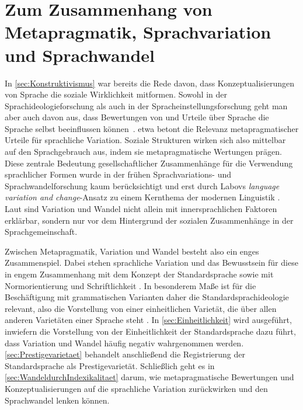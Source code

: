 \section[Zusammenhang von Metapragmatik, Sprachvariation und Sprachwandel]{Zum Zusammenhang von Metapragmatik, Sprachvariation und Sprachwandel}
\label{sec:MetapragmatikVariationWandel}
\begin{sloppypar}
In \autoref{sec:Konstruktivismus} war bereits die Rede davon, dass Konzeptualisierungen von Sprache die soziale Wirklichkeit mitformen. 
Sowohl in der Sprachideologieforschung als auch in der Spracheinstellungsforschung geht man aber auch davon aus, dass Bewertungen von und Urteile über Sprache die Sprache selbst beeinflussen k{\"o}nnen~\citep[s.][xxiv]{Preston.1999b}. 
\citet[45]{Preston2004} etwa betont die Relevanz metapragmatischer Urteile für sprachliche Variation.
Soziale Strukturen wirken sich also mittelbar auf den Sprachgebrauch aus, indem sie metapragmatische Wertungen prägen. 
Diese zentrale Bedeutung gesellschaftlicher Zusammenhänge für die Verwendung sprachlicher Formen wurde in der frühen Sprachvariations- und Sprachwandelforschung kaum berücksichtigt und erst durch Labovs \textit{language variation and change}-Ansatz zu einem Kernthema der modernen Linguistik \citep[s.][25]{Hazen.2011}.
Laut \citet[75]{Labov.2006} sind Variation und Wandel nicht allein mit innersprachlichen Faktoren erklärbar, sondern nur vor dem Hintergrund der sozialen Zusammenhänge in der Sprachgemeinschaft.
\end{sloppypar}

Zwischen Metapragmatik, Variation und Wandel besteht also ein enges Zusammenspiel. 
Dabei stehen sprachliche Variation und das Bewusstsein f{\"u}r diese in engem Zusammenhang mit dem Konzept der Standardsprache sowie mit Normorientierung und Schriftlichkeit \citep[s.][325]{Langer.}. 
In besonderem Maße ist für die Beschäftigung mit grammatischen Varianten daher die Standardsprachideologie relevant, also die Vorstellung von einer einheitlichen Varietät, die über allen anderen Varietäten einer Sprache steht \citep[s.][]{Milroy2001}.
In \autoref{sec:Einheitlichkeit} wird ausgeführt, inwiefern die Vorstellung von der Einheitlichkeit der Standardsprache dazu führt, dass Variation und Wandel häufig negativ wahrgenommen werden.
\autoref{sec:Prestigevarietaet} behandelt anschließend die Registrierung der Standardsprache als Prestigevarietät. 
Schließlich geht es in \autoref{sec:WandeldurchIndexikalitaet} darum, wie metapragmatische Bewertungen und Konzeptualisierungen auf die sprachliche Variation zurückwirken und den Sprachwandel lenken können. 

